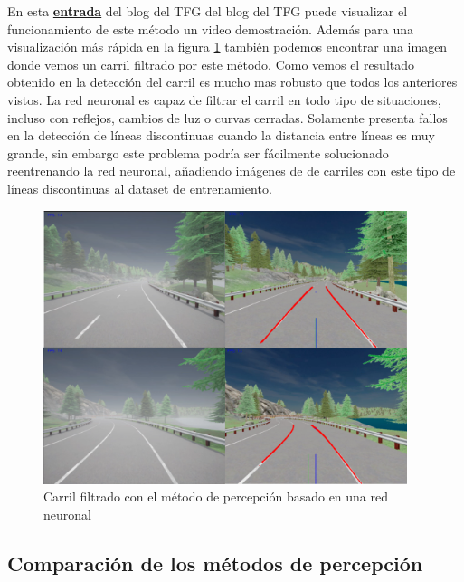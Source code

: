 En esta \href{https://roboticslaburjc.github.io/2022-tfg-juancamilo-carmona/DEMOS/}{\textbf{entrada}} del blog del \ac{TFG} del blog del \ac{TFG} puede visualizar el funcionamiento de este método un video demostración. Además para una visualización más rápida en la figura \ref{fig:Carril filtrado con el método basado en una red neuronal}  también podemos encontrar una imagen donde vemos un carril filtrado por este método. Como vemos el resultado obtenido en la detección del carril es mucho mas robusto que todos los anteriores vistos. La red neuronal es capaz de filtrar el carril en todo tipo de situaciones, incluso con reflejos, cambios de luz o curvas cerradas. Solamente presenta fallos en la detección de líneas discontinuas cuando la distancia entre líneas es muy grande, sin embargo este problema podría ser fácilmente solucionado reentrenando la red neuronal, añadiendo imágenes de de carriles con este tipo de líneas discontinuas al dataset de entrenamiento.

\begin{figure} [H]
	\begin{center}
	\includegraphics[height=8cm]{imagenes/cap4/graphics_deeplearning/carril_filtrado.pdf}
	\end{center}
	\caption[Carril filtrado con el método de percepción basado en una red neuronal]{Carril filtrado con el método de percepción basado en una red neuronal}
	\label{fig:Carril filtrado con el método basado en una red neuronal}
\end{figure}
\subsection{Comparación de los métodos de percepción}
\label{Comparación de los métodos de detección}

